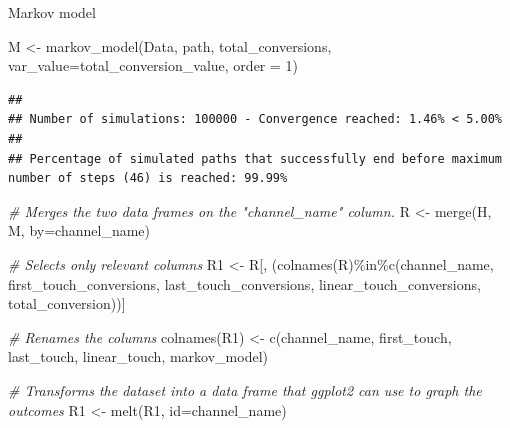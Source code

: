 \documentclass[
]{book}
\newenvironment{Shaded}{\begin{snugshade}}{\end{snugshade}}
\newcommand{\AttributeTok}[1]{\textcolor[rgb]{0.77,0.63,0.00}{#1}}
\newcommand{\CommentTok}[1]{\textcolor[rgb]{0.56,0.35,0.01}{\textit{#1}}}
\newcommand{\DecValTok}[1]{\textcolor[rgb]{0.00,0.00,0.81}{#1}}
\newcommand{\FunctionTok}[1]{\textcolor[rgb]{0.00,0.00,0.00}{#1}}
\newcommand{\NormalTok}[1]{#1}
\newcommand{\OtherTok}[1]{\textcolor[rgb]{0.56,0.35,0.01}{#1}}
\newcommand{\SpecialCharTok}[1]{\textcolor[rgb]{0.00,0.00,0.00}{#1}}
\newcommand{\StringTok}[1]{\textcolor[rgb]{0.31,0.60,0.02}{#1}}
\begin{document}
Markov model

\begin{Shaded}
\begin{Highlighting}[]
\NormalTok{M }\OtherTok{\textless{}{-}} \FunctionTok{markov\_model}\NormalTok{(Data, }\StringTok{\textquotesingle{}path\textquotesingle{}}\NormalTok{, }\StringTok{\textquotesingle{}total\_conversions\textquotesingle{}}\NormalTok{, }\AttributeTok{var\_value=}\StringTok{\textquotesingle{}total\_conversion\_value\textquotesingle{}}\NormalTok{, }\AttributeTok{order =} \DecValTok{1}\NormalTok{) }
\end{Highlighting}
\end{Shaded}

\begin{verbatim}
## 
## Number of simulations: 100000 - Convergence reached: 1.46% < 5.00%
## 
## Percentage of simulated paths that successfully end before maximum number of steps (46) is reached: 99.99%
\end{verbatim}

\begin{Shaded}
\begin{Highlighting}[]
\CommentTok{\# Merges the two data frames on the "channel\_name" column.}
\NormalTok{R }\OtherTok{\textless{}{-}} \FunctionTok{merge}\NormalTok{(H, M, }\AttributeTok{by=}\StringTok{\textquotesingle{}channel\_name\textquotesingle{}}\NormalTok{) }

\CommentTok{\# Selects only relevant columns}
\NormalTok{R1 }\OtherTok{\textless{}{-}}\NormalTok{ R[, (}\FunctionTok{colnames}\NormalTok{(R)}\SpecialCharTok{\%in\%}\FunctionTok{c}\NormalTok{(}\StringTok{\textquotesingle{}channel\_name\textquotesingle{}}\NormalTok{, }\StringTok{\textquotesingle{}first\_touch\_conversions\textquotesingle{}}\NormalTok{, }\StringTok{\textquotesingle{}last\_touch\_conversions\textquotesingle{}}\NormalTok{, }\StringTok{\textquotesingle{}linear\_touch\_conversions\textquotesingle{}}\NormalTok{, }\StringTok{\textquotesingle{}total\_conversion\textquotesingle{}}\NormalTok{))]}

\CommentTok{\# Renames the columns}
\FunctionTok{colnames}\NormalTok{(R1) }\OtherTok{\textless{}{-}} \FunctionTok{c}\NormalTok{(}\StringTok{\textquotesingle{}channel\_name\textquotesingle{}}\NormalTok{, }\StringTok{\textquotesingle{}first\_touch\textquotesingle{}}\NormalTok{, }\StringTok{\textquotesingle{}last\_touch\textquotesingle{}}\NormalTok{, }\StringTok{\textquotesingle{}linear\_touch\textquotesingle{}}\NormalTok{, }\StringTok{\textquotesingle{}markov\_model\textquotesingle{}}\NormalTok{) }

\CommentTok{\# Transforms the dataset into a data frame that ggplot2 can use to graph the outcomes}
\NormalTok{R1 }\OtherTok{\textless{}{-}} \FunctionTok{melt}\NormalTok{(R1, }\AttributeTok{id=}\StringTok{\textquotesingle{}channel\_name\textquotesingle{}}\NormalTok{)}
\end{Highlighting}
\end{Shaded}
\end{document}
